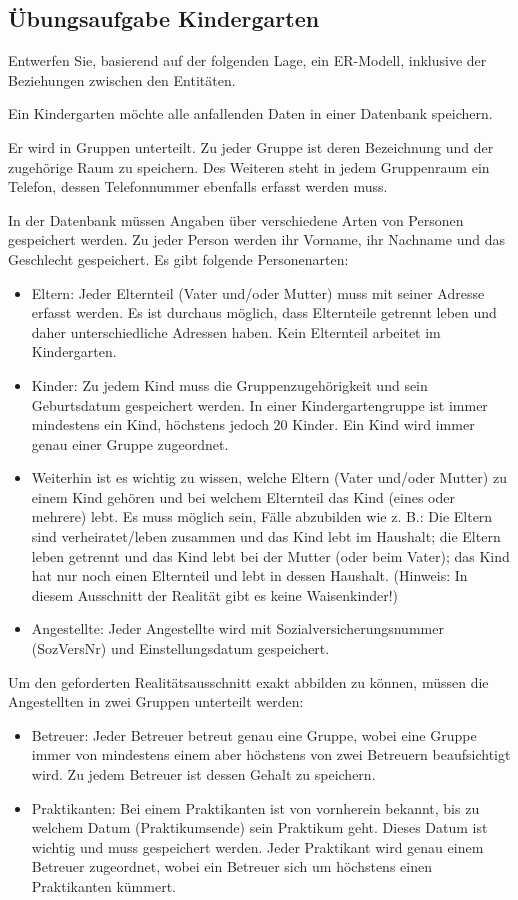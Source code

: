 \subsection{Übungsaufgabe Kindergarten}
Entwerfen Sie, basierend auf der folgenden Lage, ein ER-Modell, inklusive der Beziehungen zwischen den Entit\"{a}ten.

Ein Kindergarten möchte alle anfallenden Daten in einer Datenbank speichern.

Er wird in Gruppen unterteilt. Zu jeder Gruppe ist deren Bezeichnung und der zugehörige Raum zu speichern. Des Weiteren steht in jedem Gruppenraum ein Telefon, dessen Telefonnummer ebenfalls erfasst werden muss.

In der Datenbank müssen Angaben über verschiedene Arten von Personen gespeichert werden. Zu jeder Person werden ihr Vorname, ihr Nachname und das Geschlecht gespeichert. Es gibt folgende Personenarten:
\begin{itemize}
    \item Eltern: Jeder Elternteil (Vater und/oder Mutter) muss mit seiner Adresse erfasst werden. Es ist durchaus möglich, dass Elternteile getrennt leben und daher unterschiedliche Adressen haben. Kein Elternteil arbeitet im Kindergarten.
    \item Kinder: Zu jedem Kind muss die Gruppenzugehörigkeit und sein Geburtsdatum gespeichert werden. In einer Kindergartengruppe ist immer mindestens ein Kind, höchstens jedoch 20 Kinder. Ein Kind wird immer genau einer Gruppe zugeordnet.
    \item Weiterhin ist es wichtig zu wissen, welche Eltern (Vater und/oder Mutter) zu einem Kind gehören und bei welchem Elternteil das Kind (eines oder mehrere) lebt. Es muss möglich sein, Fälle abzubilden wie z. B.: Die Eltern sind verheiratet/leben zusammen und das Kind lebt im Haushalt; die Eltern leben getrennt und das Kind lebt bei der Mutter (oder beim Vater); das Kind hat nur noch einen Elternteil und lebt in dessen Haushalt. (Hinweis: In diesem Ausschnitt der Realität gibt es keine Waisenkinder!)
    \item Angestellte: Jeder Angestellte wird mit Sozialversicherungsnummer (SozVersNr) und Einstellungsdatum gespeichert.
\end{itemize}

Um den geforderten Realitätsausschnitt exakt abbilden zu können,
müssen die Angestellten in zwei Gruppen unterteilt werden:

\begin{itemize}
    \item Betreuer: Jeder Betreuer betreut genau eine Gruppe, wobei eine Gruppe immer von mindestens einem aber höchstens von zwei Betreuern beaufsichtigt wird. Zu jedem Betreuer ist dessen Gehalt zu speichern.

    \item Praktikanten: Bei einem Praktikanten ist von vornherein bekannt, bis zu welchem Datum (Praktikumsende) sein Praktikum geht. Dieses Datum ist wichtig und muss gespeichert werden. Jeder Praktikant wird genau einem Betreuer zugeordnet, wobei ein Betreuer sich um höchstens einen Praktikanten kümmert.
\end{itemize}
\clearpage
